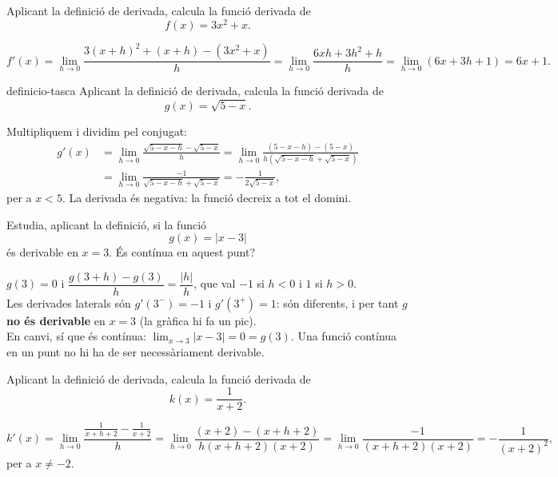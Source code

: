 \begin{apartats}

Aplicant la definició de derivada, calcula la funció derivada de
\[
f(x)=3x^2+x .
\]

\begin{solucio}
\[
f'(x)=\lim_{h\to0}\frac{3(x+h)^2+(x+h)-\left(3x^2+x\right)}{h}
=\lim_{h\to0}\frac{6xh+3h^2+h}{h}=\lim_{h\to0}(6x+3h+1)=6x+1 .
\]
\end{solucio}

\begin{tria}{definicio-tasca}
Aplicant la definició de derivada, calcula la funció derivada de
\[
g(x)=\sqrt{5-x} .
\]

\begin{solucio}
Multipliquem i dividim pel conjugat:
\[
\begin{aligned}
g'(x)&=\lim_{h\to0}\frac{\sqrt{5-x-h}-\sqrt{5-x}}{h}
=\lim_{h\to0}\frac{(5-x-h)-(5-x)}{h\left(\sqrt{5-x-h}+\sqrt{5-x}\right)}\\
&=\lim_{h\to0}\frac{-1}{\sqrt{5-x-h}+\sqrt{5-x}}=-\frac{1}{2\sqrt{5-x}} ,
\end{aligned}
\]
per a $x<5$. La derivada és negativa: la funció decreix a tot el domini.
\end{solucio}

Estudia, aplicant la definició, si la funció
\[
g(x)=|x-3|
\]
és derivable en $x=3$. És contínua en aquest punt?

\begin{solucio}
$g(3)=0$ i $\dfrac{g(3+h)-g(3)}{h}=\dfrac{|h|}{h}$, que val $-1$ si $h<0$ i $1$ si $h>0$.\\
Les derivades laterals són $g'(3^-)=-1$ i $g'(3^+)=1$: són diferents, i per tant $g$
\textbf{no és derivable} en $x=3$ (la gràfica hi fa un pic).\\
En canvi, sí que és contínua: $\lim_{x\to3}|x-3|=0=g(3)$. Una funció contínua en un punt no
hi ha de ser necessàriament derivable.
\end{solucio}
\end{tria}

\begin{nomesllarg}
Aplicant la definició de derivada, calcula la funció derivada de
\[
k(x)=\frac{1}{x+2} .
\]

\begin{solucio}
\[
k'(x)=\lim_{h\to0}\frac{\frac{1}{x+h+2}-\frac{1}{x+2}}{h}
=\lim_{h\to0}\frac{(x+2)-(x+h+2)}{h(x+h+2)(x+2)}
=\lim_{h\to0}\frac{-1}{(x+h+2)(x+2)}=-\frac{1}{(x+2)^2} ,
\]
per a $x\neq-2$.
\end{solucio}
\end{nomesllarg}

\end{apartats}
